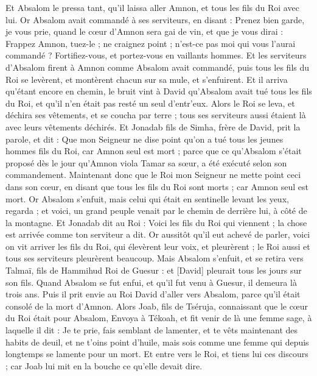 \begin{multicols}{2}
Et Absalom le pressa tant, qu'il laissa aller Amnon, et tous les fils du Roi avec lui.
Or Absalom avait commandé à ses serviteurs, en disant : Prenez bien garde, je vous prie, quand le cœur d'Amnon sera gai de vin, et que je vous dirai : Frappez Amnon, tuez-le ; ne craignez point ; n'est-ce pas moi qui vous l'aurai commandé ? Fortifiez-vous, et portez-vous en vaillants hommes.
Et les serviteurs d'Absalom firent à Amnon comme Absalom avait commandé, puis tous les fils du Roi se levèrent, et montèrent chacun sur sa mule, et s'enfuirent.
Et il arriva qu'étant encore en chemin, le bruit vint à David qu'Absalom avait tué tous les fils du Roi, et qu'il n'en était pas resté un seul d'entr'eux.
Alors le Roi se leva, et déchira ses vêtements, et se coucha par terre ; tous ses serviteurs aussi étaient là avec leurs vêtements déchirés.
Et Jonadab fils de Simha, frère de David, prit la parole, et dit : Que mon Seigneur ne dise point qu'on a tué tous les jeunes hommes fils du Roi, car Amnon seul est mort ; parce que ce qu'Absalom s'était proposé dès le jour qu'Amnon viola Tamar sa sœur, a été exécuté selon son commandement.
Maintenant donc que le Roi mon Seigneur ne mette point ceci dans son cœur, en disant que tous les fils du Roi sont morts ; car Amnon seul est mort.
Or Absalom s'enfuit, mais celui qui était en sentinelle levant les yeux, regarda ; et voici, un grand peuple venait par le chemin de derrière lui, à côté de la montagne.
Et Jonadab dit au Roi : Voici les fils du Roi qui viennent ; la chose est arrivée comme ton serviteur a dit.
Or aussitôt qu'il eut achevé de parler, voici on vit arriver les fils du Roi, qui élevèrent leur voix, et pleurèrent ; le Roi aussi et tous ses serviteurs pleurèrent beaucoup.
Mais Absalom s'enfuit, et se retira vers Talmaï, fils de Hammihud Roi de Guesur : et [David] pleurait tous les jours sur son fils.
Quand Absalom se fut enfui, et qu'il fut venu à Guesur, il demeura là trois ans.
Puis il prit envie au Roi David d'aller vers Absalom, parce qu'il était consolé de la mort d'Amnon.
\VerseOne{}Alors Joab, fils de Tséruja, connaissant que le cœur du Roi était pour Absalom,
Envoya à Tékoah, et fit venir de là une femme sage, à laquelle il dit : Je te prie, fais semblant de lamenter, et te vêts maintenant des habits de deuil, et ne t'oins point d'huile, mais sois comme une femme qui depuis longtemps se lamente pour un mort.
Et entre vers le Roi, et tiens lui ces discours ; car Joab lui mit en la bouche ce qu'elle devait dire.

\end{multicols}
